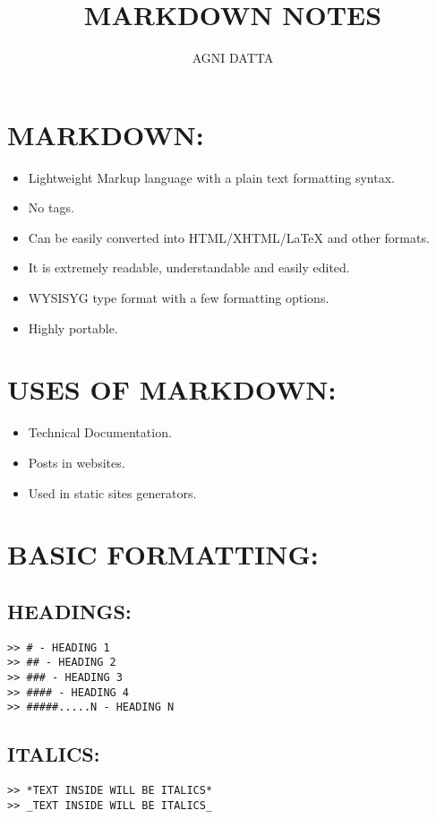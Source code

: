 \documentclass[10pt]{article}
\begin{document}
\title{\textbf{MARKDOWN NOTES}}
\author{AGNI DATTA}

\maketitle
{\small{}\tableofcontents{}}{\small\par}

\pagebreak{}

\section{MARKDOWN:}
\begin{itemize}
\item Lightweight Markup language with a plain text formatting syntax.
\item No tags.
\item Can be easily converted into HTML/XHTML/\LaTeX\: and other formats.
\item It is extremely readable, understandable and easily edited.
\item WYSISYG type format with a few formatting options.
\item Highly portable.
\end{itemize}

\section{USES OF MARKDOWN:}
\begin{itemize}
\item Technical Documentation.
\item Posts in websites.
\item Used in static sites generators.
\end{itemize}

\section{BASIC FORMATTING:}

\subsection{HEADINGS:}
\begin{verbatim}
>> # - HEADING 1
>> ## - HEADING 2
>> ### - HEADING 3
>> #### - HEADING 4
>> #####.....N - HEADING N
\end{verbatim}

\subsection{ITALICS:}
\begin{verbatim}
>> *TEXT INSIDE WILL BE ITALICS*
>> _TEXT INSIDE WILL BE ITALICS_
\end{verbatim}
\end{document}
